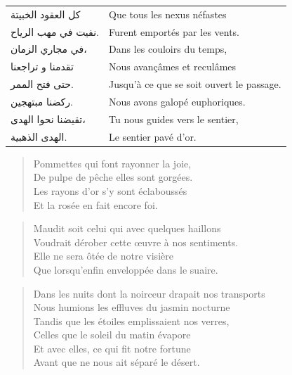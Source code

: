 \begin{longtable}{R{0.3\textwidth} L{0.65\textwidth}}
  \textarabic{كل العقود الخبيتة}     & Que tous les nexus néfastes\\  %
  \textarabic{نفيت في مهب الرياح.}   & Furent emportés par les vents.\bigskip \\ 
  \textarabic{في مجاري الزمان،}      & Dans les couloirs du temps,\\  %
  \textarabic{تقدمنا و تراجعنا}     & Nous avançâmes et reculâmes\bigskip \\ 
  \textarabic{حتى فتح الممر.}        & Jusqu’à ce que se soit ouvert le passage.\\  %
  \textarabic{ركضنا مبتهجين.}        & Nous avons galopé euphoriques.\bigskip \\ 
  \textarabic{تقيضنا نحوا الهدى،}    & Tu nous guides vers le sentier,\\  %
  \textarabic{الهدى الذهبية.}        & Le sentier pavé d’or.\\  %
\end{longtable}

\begin{verse}\quatrain
  Pommettes qui font rayonner la joie,\\  %
  De pulpe de pêche elles sont gorgées.\\  %
  Les rayons d’or s’y sont éclaboussés\\  %
  Et la rosée en fait encore foi.
\end{verse}


\begin{verse}\quatrain
  Maudit soit celui qui avec quelques haillons\\  %
  Voudrait dérober cette œuvre à nos sentiments.\\  %
  Elle ne sera ôtée de notre visière\\  %
  Que lorsqu’enfin enveloppée dans le suaire.\\  %
\end{verse}


\begin{verse}\sizain
  Dans les nuits dont la noirceur drapait nos transports\\  %
  Nous humions les effluves du jasmin nocturne\\  %
  Tandis que les étoiles emplissaient nos verres,\\  %
  Celles que le soleil du matin évapore\\  %
  Et avec elles, ce qui fit notre fortune\\  %
  Avant que ne nous ait séparé le désert.
\end{verse}


